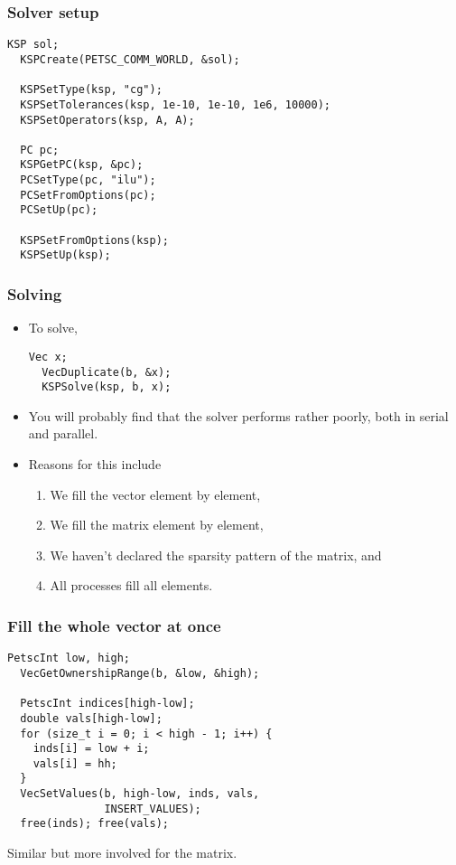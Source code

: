 \begin{frame}[fragile]
  \frametitle{Solver setup}
  \begin{lstlisting}[style=c]
  KSP sol;
  KSPCreate(PETSC_COMM_WORLD, &sol);

  KSPSetType(ksp, "cg");
  KSPSetTolerances(ksp, 1e-10, 1e-10, 1e6, 10000);
  KSPSetOperators(ksp, A, A);

  PC pc;
  KSPGetPC(ksp, &pc);
  PCSetType(pc, "ilu");
  PCSetFromOptions(pc);
  PCSetUp(pc);

  KSPSetFromOptions(ksp);
  KSPSetUp(ksp);
  \end{lstlisting}
\end{frame}

\begin{frame}[fragile]
  \frametitle{Solving}
  \begin{itemize}
  \item To solve,
    \begin{lstlisting}[style=c]
  Vec x;
  VecDuplicate(b, &x);
  KSPSolve(ksp, b, x);
    \end{lstlisting}
  \item You will probably find that the solver performs rather poorly, both in
    serial and parallel.
  \item Reasons for this include
    \begin{enumerate}
    \item We fill the vector element by element,
    \item We fill the matrix element by element,
    \item We haven't declared the sparsity pattern of the matrix, and
    \item All processes fill all elements.
    \end{enumerate}
  \end{itemize}
\end{frame}

\begin{frame}[fragile]
  \frametitle{Fill the whole vector at once}
  \begin{lstlisting}[style=c]
  PetscInt low, high;
  VecGetOwnershipRange(b, &low, &high);

  PetscInt indices[high-low];
  double vals[high-low];
  for (size_t i = 0; i < high - 1; i++) {
    inds[i] = low + i;
    vals[i] = hh;
  }
  VecSetValues(b, high-low, inds, vals,
               INSERT_VALUES);
  free(inds); free(vals);
  \end{lstlisting}
  Similar but more involved for the matrix.
\end{frame}

